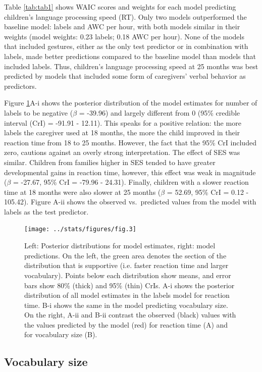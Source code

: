 \documentclass[
  english,
  man,floatsintext]{apa6}
\begin{document}
Table \ref{tab:tab1} shows WAIC scores and weights for each model predicting children's language processing speed (RT). Only two models outperformed the baseline model: labels and AWC per hour, with both models similar in their weights (model weights: 0.23 labels; 0.18 AWC per hour). None of the models that included gestures, either as the only test predictor or in combination with labels, made better predictions compared to the baseline model than models that included labels. Thus, children's language processing speed at 25 months was best predicted by models that included some form of caregivers' verbal behavior as predictors.

Figure \ref{fig:fig3}A-i shows the posterior distribution of the model estimates for number of labels to be negative (\(\beta\) = -39.96) and largely different from 0 (95\% credible interval (CrI) = -91.91 - 12.11). This speaks for a positive relation: the more labels the caregiver used at 18 months, the more the child improved in their reaction time from 18 to 25 months. However, the fact that the 95\% CrI included zero, cautions against an overly strong interpretation. The effect of SES was similar. Children from families higher in SES tended to have greater developmental gains in reaction time, however, this effect was weak in magnitude (\(\beta\) = -27.67, 95\% CrI = -79.96 - 24.31). Finally, children with a slower reaction time at 18 months were also slower at 25 months (\(\beta\) = 52.69, 95\% CrI = 0.12 - 105.42). Figure A-ii shows the observed vs.~predicted values from the model with labels as the test predictor.

\begin{figure}
\texttt{[image: ../stats/figures/fig.3]} \caption{Left: Posterior distributions for model estimates, right: model predictions. On the left, the green area denotes the section of the distribution that is supportive (i.e. faster reaction time and larger vocabulary). Points below each distribution show means, and error bars show 80\% (thick) and 95\% (thin) CrIs.  A-i shows the posterior distribution of all model estimates in the labels model for reaction time. B-i shows the same in the model predicting vocabulary size. On the right, A-ii and B-ii contrast the observed (black) values with the values predicted by the model (red) for reaction time (A) and for vocabulary size (B).}\label{fig:fig3}
\end{figure}

\hypertarget{vocabulary-size-1}{%
\subsection{Vocabulary size}\label{vocabulary-size-1}}
\end{document}
